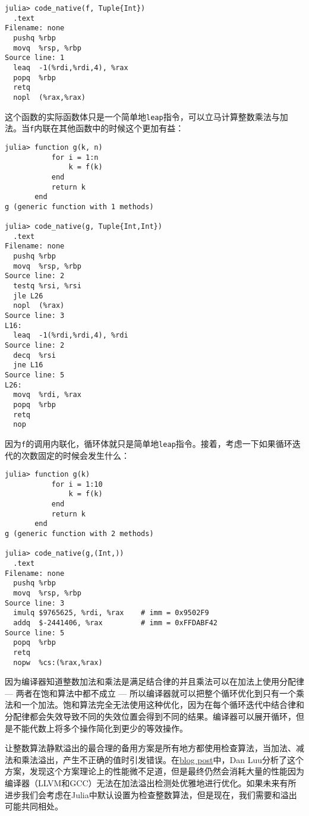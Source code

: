 \begin{verbatim}
julia> code_native(f, Tuple{Int})
  .text
Filename: none
  pushq %rbp
  movq  %rsp, %rbp
Source line: 1
  leaq  -1(%rdi,%rdi,4), %rax
  popq  %rbp
  retq
  nopl  (%rax,%rax)
\end{verbatim}



这个函数的实际函数体只是一个简单地\texttt{leap}指令，可以立马计算整数乘法与加法。当\texttt{f}内联在其他函数中的时候这个更加有益：




\begin{verbatim}
julia> function g(k, n)
           for i = 1:n
               k = f(k)
           end
           return k
       end
g (generic function with 1 methods)

julia> code_native(g, Tuple{Int,Int})
  .text
Filename: none
  pushq %rbp
  movq  %rsp, %rbp
Source line: 2
  testq %rsi, %rsi
  jle L26
  nopl  (%rax)
Source line: 3
L16:
  leaq  -1(%rdi,%rdi,4), %rdi
Source line: 2
  decq  %rsi
  jne L16
Source line: 5
L26:
  movq  %rdi, %rax
  popq  %rbp
  retq
  nop
\end{verbatim}



因为\texttt{f}的调用内联化，循环体就只是简单地\texttt{leap}指令。接着，考虑一下如果循环迭代的次数固定的时候会发生什么：




\begin{verbatim}
julia> function g(k)
           for i = 1:10
               k = f(k)
           end
           return k
       end
g (generic function with 2 methods)

julia> code_native(g,(Int,))
  .text
Filename: none
  pushq %rbp
  movq  %rsp, %rbp
Source line: 3
  imulq $9765625, %rdi, %rax    # imm = 0x9502F9
  addq  $-2441406, %rax         # imm = 0xFFDABF42
Source line: 5
  popq  %rbp
  retq
  nopw  %cs:(%rax,%rax)
\end{verbatim}



因为编译器知道整数加法和乘法是满足结合律的并且乘法可以在加法上使用分配律 — 两者在饱和算法中都不成立 — 所以编译器就可以把整个循环优化到只有一个乘法和一个加法。饱和算法完全无法使用这种优化，因为在每个循环迭代中结合律和分配律都会失效导致不同的失效位置会得到不同的结果。编译器可以展开循环，但是不能代数上将多个操作简化到更少的等效操作。



让整数算法静默溢出的最合理的备用方案是所有地方都使用检查算法，当加法、减法和乘法溢出，产生不正确的值时引发错误。在\href{http://danluu.com/integer-overflow/}{blog post}中，Dan Luu分析了这个方案，发现这个方案理论上的性能微不足道，但是最终仍然会消耗大量的性能因为编译器（LLVM和GCC）无法在加法溢出检测处优雅地进行优化。如果未来有所进步我们会考虑在Julia中默认设置为检查整数算法，但是现在，我们需要和溢出可能共同相处。



